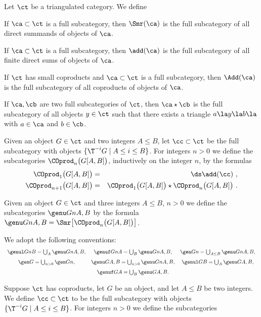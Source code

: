 \documentclass[11pt]{amsart}
\begin{document}
Let $\ct$ be a triangulated category. We define
\be
\item
  If $\ca\subset\ct$ is a full subcategory, then $\Smr(\ca)$ is
  the full subcategory of all direct summands of objects of $\ca$.
\item
  If $\ca\subset\ct$ is a full subcategory, then $\add(\ca)$ is
  the full subcategory of all finite direct sums of objects of $\ca$.
\item
  If $\ct$ has small coproducts and $\ca\subset\ct$  is a
  full subcategory, then $\Add(\ca)$ is
  the full subcategory of all coproducts of objects of $\ca$.
\item
  If $\ca,\cb$ are two full subcategories of
  $\ct$, then $\ca\star\cb$ is
  the full subcategory of all objects $y\in\ct$
  such that there exists a triangle $a\la y\la b\la$ with $a\in\ca$ and
  $b\in\cb$.
\item
  Given an object $G\in\ct$ and two integers $A\leq B$, let
  $\cc\subset\ct$ be the full subcategory with objects
  $\{\T^{-i}G\mid A\leq i\leq B\}$.
  For integers $n>0$ we define the subcategories
  $\COprod_n\big(G[A,B]\big)$, inductively on the integer $n$, by the formulas
\begin{eqnarray*}
\COprod_1^{}\big(G[A,B]\big)&=&\ds\add(\cc)\ ,\\
\COprod_{n+1}^{}\big(G[A,B]\big)&=&
\COprod_1^{}\big(G[A,B]\big)\star\COprod_n^{}\big(G[A,B]\big)\ .
\end{eqnarray*}
\item
Given an object $G\in\ct$ and three integers $A\leq B$, $n>0$
  we define the subcategories $\genu Gn{A,B}$ by the formula
  $\genu Gn{A,B}=\Smr\big[\COprod_n^{}\big(G[A,B]\big)\big]$.
\item
  We adopt the following conventions:
  \[\begin{array}{ccc}\genul GnB=\bigcup_{A}\genu Gn{A,B}, &
  \genuf GnA=\bigcup_B^{}\genu Gn{A,B},&
  \gen Gn=\bigcup_{A\leq B}^{}\genu Gn{A,B},\\*[7pt]
  \gen G{}=\bigcup_{n>0}^{}\gen Gn, &
  \genu G{}{A,B}=\bigcup_{n>0}^{}\genu Gn{A,B}, &
  \genul G{}B=\bigcup_{A}^{}\genu G{}{A,B},\\*[7pt]
& \genuf G{}A=\bigcup_{B}^{}\genu G{}{A,B}.&
  \end{array}
\]
\item
  Suppose $\ct$ has coproducts, let $G$ be an object, and let
   $A\leq B$ be two integers. We define
  $\cc\subset\ct$ to be the full subcategory with objects
  $\{\T^{-i}G\mid A\leq i\leq B\}$.
  For integers $n>0$ we define the subcategories
\end{document}
